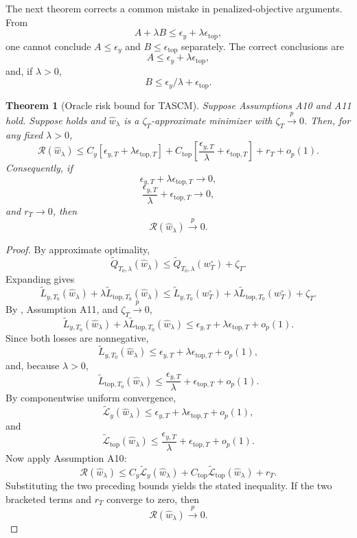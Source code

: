 \documentclass[11pt]{article}
\theoremstyle{plain}
\newtheorem{theorem}{Theorem}[section]
\theoremstyle{definition}
\theoremstyle{remark}
\newcommand{\1}{\mathbbm{1}}
\newcommand{\pto}{\xrightarrow{p}}
\begin{document}
The next theorem corrects a common mistake in penalized-objective arguments.
From
\[
A+\lambda B
\le
\epsilon_y+\lambda\epsilon_{\mathrm{top}},
\]
one cannot conclude \(A\le \epsilon_y\) and
\(B\le \epsilon_{\mathrm{top}}\) separately. The correct conclusions are
\[
A\le \epsilon_y+\lambda\epsilon_{\mathrm{top}},
\]
and, if \(\lambda>0\),
\[
B\le \epsilon_y/\lambda+\epsilon_{\mathrm{top}}.
\]

\begin{theorem}[Oracle risk bound for TASCM]
\label{thm:oracle-risk}
Suppose Assumptions A10 and A11 hold. Suppose  holds
and \(\widehat w_\lambda\) is a \(\zeta_T\)-approximate minimizer with
\(\zeta_T\pto0\). Then, for any fixed \(\lambda>0\),
\[
\mathcal R(\widehat w_\lambda)
\le
C_y
\left[
\epsilon_{y,T}
+
\lambda\epsilon_{\mathrm{top},T}
\right]
+
C_{\mathrm{top}}
\left[
\frac{\epsilon_{y,T}}{\lambda}
+
\epsilon_{\mathrm{top},T}
\right]
+
r_T
+
o_p(1).
\]
Consequently, if
\[
\epsilon_{y,T}
+
\lambda\epsilon_{\mathrm{top},T}
\to0,
\]
\[
\frac{\epsilon_{y,T}}{\lambda}
+
\epsilon_{\mathrm{top},T}
\to0,
\]
and \(r_T\to0\), then
\[
\mathcal R(\widehat w_\lambda)\pto0.
\]
\end{theorem}

\begin{proof}
By approximate optimality,
\[
\widetilde Q_{T_0,\lambda}(\widehat w_\lambda)
\le
\widetilde Q_{T_0,\lambda}(w_T^\circ)
+
\zeta_T.
\]
Expanding gives
\[
\widetilde L_{y,T_0}(\widehat w_\lambda)
+
\lambda
\widetilde L_{\mathrm{top},T_0}(\widehat w_\lambda)
\le
\widetilde L_{y,T_0}(w_T^\circ)
+
\lambda
\widetilde L_{\mathrm{top},T_0}(w_T^\circ)
+
\zeta_T.
\]
By , Assumption A11, and \(\zeta_T\pto0\),
\[
\widetilde L_{y,T_0}(\widehat w_\lambda)
+
\lambda
\widetilde L_{\mathrm{top},T_0}(\widehat w_\lambda)
\le
\epsilon_{y,T}
+
\lambda\epsilon_{\mathrm{top},T}
+
o_p(1).
\]
Since both losses are nonnegative,
\[
\widetilde L_{y,T_0}(\widehat w_\lambda)
\le
\epsilon_{y,T}
+
\lambda\epsilon_{\mathrm{top},T}
+
o_p(1),
\]
and, because \(\lambda>0\),
\[
\widetilde L_{\mathrm{top},T_0}(\widehat w_\lambda)
\le
\frac{\epsilon_{y,T}}{\lambda}
+
\epsilon_{\mathrm{top},T}
+
o_p(1).
\]
By componentwise uniform convergence,
\[
\widetilde{\mathcal L}_y(\widehat w_\lambda)
\le
\epsilon_{y,T}
+
\lambda\epsilon_{\mathrm{top},T}
+
o_p(1),
\]
and
\[
\widetilde{\mathcal L}_{\mathrm{top}}(\widehat w_\lambda)
\le
\frac{\epsilon_{y,T}}{\lambda}
+
\epsilon_{\mathrm{top},T}
+
o_p(1).
\]
Now apply Assumption A10:
\[
\mathcal R(\widehat w_\lambda)
\le
C_y\widetilde{\mathcal L}_y(\widehat w_\lambda)
+
C_{\mathrm{top}}\widetilde{\mathcal L}_{\mathrm{top}}(\widehat w_\lambda)
+
r_T.
\]
Substituting the two preceding bounds yields the stated inequality. If the two
bracketed terms and \(r_T\) converge to zero, then
\[
\mathcal R(\widehat w_\lambda)\pto0.
\]
\end{proof}
\end{document}
